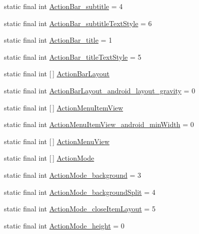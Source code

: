 \begin{DoxyCompactItemize}
\item 
static final int \hyperlink{classproject4_1_1xaria_1_1R_1_1styleable_a7cca6eb4000951d6b787beaf09c98f90}{Action\+Bar\+\_\+subtitle} = 4
\item 
static final int \hyperlink{classproject4_1_1xaria_1_1R_1_1styleable_a88fa5db9b1092133d576b1174279baa1}{Action\+Bar\+\_\+subtitle\+Text\+Style} = 6
\item 
static final int \hyperlink{classproject4_1_1xaria_1_1R_1_1styleable_a5d0e4c195dd446c70c4981931970d991}{Action\+Bar\+\_\+title} = 1
\item 
static final int \hyperlink{classproject4_1_1xaria_1_1R_1_1styleable_a981a219de0af41bb112ba02e0268fb0b}{Action\+Bar\+\_\+title\+Text\+Style} = 5
\item 
static final int \mbox{[}$\,$\mbox{]} \hyperlink{classproject4_1_1xaria_1_1R_1_1styleable_ada09e4a37ff0e4e66c0304b7927de70f}{Action\+Bar\+Layout}
\item 
static final int \hyperlink{classproject4_1_1xaria_1_1R_1_1styleable_afca42df30098e2a6a78629b9bf6f64f7}{Action\+Bar\+Layout\+\_\+android\+\_\+layout\+\_\+gravity} = 0
\item 
static final int \mbox{[}$\,$\mbox{]} \hyperlink{classproject4_1_1xaria_1_1R_1_1styleable_adc45f11ac1a2148137a78ceb6d3af625}{Action\+Menu\+Item\+View}
\item 
static final int \hyperlink{classproject4_1_1xaria_1_1R_1_1styleable_aabb664763125f8102a4fbfe83c0b8042}{Action\+Menu\+Item\+View\+\_\+android\+\_\+min\+Width} = 0
\item 
static final int \mbox{[}$\,$\mbox{]} \hyperlink{classproject4_1_1xaria_1_1R_1_1styleable_a1642210225f706e7e970e839a22a0b00}{Action\+Menu\+View}
\item 
static final int \mbox{[}$\,$\mbox{]} \hyperlink{classproject4_1_1xaria_1_1R_1_1styleable_af9c7aa13148c68a1e3b75f513d014daa}{Action\+Mode}
\item 
static final int \hyperlink{classproject4_1_1xaria_1_1R_1_1styleable_ab1a261ccff970c0b57e913757843250e}{Action\+Mode\+\_\+background} = 3
\item 
static final int \hyperlink{classproject4_1_1xaria_1_1R_1_1styleable_a682593862d08e03c043a7c9005f99110}{Action\+Mode\+\_\+background\+Split} = 4
\item 
static final int \hyperlink{classproject4_1_1xaria_1_1R_1_1styleable_a63d571b40c30f57b55825bd03e4d00dc}{Action\+Mode\+\_\+close\+Item\+Layout} = 5
\item 
static final int \hyperlink{classproject4_1_1xaria_1_1R_1_1styleable_a7ca5db9c9a43d5a29fd3ede3ad0266cd}{Action\+Mode\+\_\+height} = 0

\end{DoxyCompactItemize}
